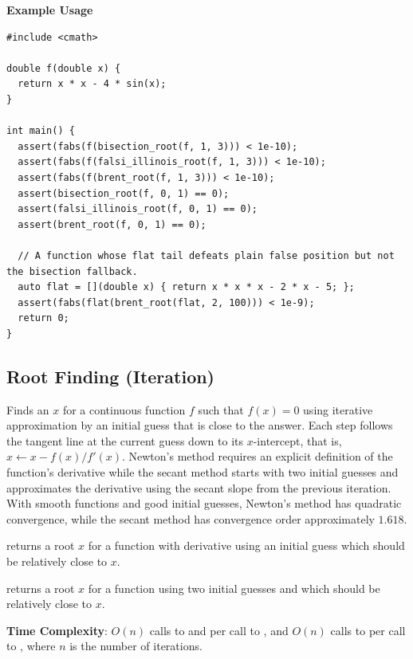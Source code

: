 \textbf{Example Usage}\par
\begin{lstlisting}[style=cpp]
#include <cmath>

double f(double x) {
  return x * x - 4 * sin(x);
}

int main() {
  assert(fabs(f(bisection_root(f, 1, 3))) < 1e-10);
  assert(fabs(f(falsi_illinois_root(f, 1, 3))) < 1e-10);
  assert(fabs(f(brent_root(f, 1, 3))) < 1e-10);
  assert(bisection_root(f, 0, 1) == 0);
  assert(falsi_illinois_root(f, 0, 1) == 0);
  assert(brent_root(f, 0, 1) == 0);

  // A function whose flat tail defeats plain false position but not the bisection fallback.
  auto flat = [](double x) { return x * x * x - 2 * x - 5; };
  assert(fabs(flat(brent_root(flat, 2, 100))) < 1e-9);
  return 0;
}
\end{lstlisting}
\subsection{Root Finding (Iteration)}
\label{sec:5.4.2}
Finds an $x$ for a continuous function $f$ such that $f(x) = 0$ using iterative approximation by an initial guess that is close to the answer. Each step follows the tangent line at the current guess down to its $x$-intercept, that is, $x \leftarrow x - f(x)/f'(x)$. Newton's method requires an explicit definition of the function's derivative while the secant method starts with two initial guesses and approximates the derivative using the secant slope from the previous iteration. With smooth functions and good initial guesses, Newton's method has quadratic convergence, while the secant method has convergence order approximately $1.618$.

\begin{compactitem}
  \item {} returns a root $x$ for a function  with derivative  using an initial guess  which should be relatively close to $x$.
  \item {} returns a root $x$ for a function  using two initial guesses  and  which should be relatively close to $x$.
\end{compactitem}

\textbf{Time Complexity}: $O(n)$ calls to  and  per call to , and $O(n)$ calls to  per call to , where $n$ is the number of iterations.

